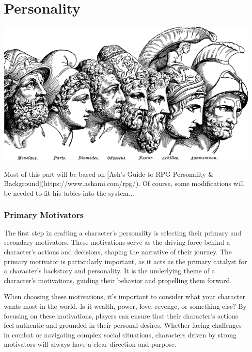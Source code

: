 \documentclass[12pt]{book}  %
\begin{document}

\chapter{Personality}

\begin{center}
    \includegraphics[width=\textwidth]{./images/personality01.pdf}
\end{center}

Most of this part will be based on [Ash’s Guide to RPG Personality \& Background](https://www.ashami.com/rpg/). Of course, some modifications will be needed to fit his tables into the system...

\subsection{\textbf{Primary Motivators}}

The first step in crafting a character's personality is selecting their primary and secondary motivators. These motivations serve as the driving force behind a character's actions and decisions, shaping the narrative of their journey. The primary motivator is particularly important, as it acts as the primary catalyst for a character's backstory and personality. It is the underlying theme of a character's motivations, guiding their behavior and propelling them forward.

When choosing these motivations, it's important to consider what your character wants most in the world. Is it wealth, power, love, revenge, or something else? By focusing on these motivations, players can ensure that their character's actions feel authentic and grounded in their personal desires. Whether facing challenges in combat or navigating complex social situations, characters driven by strong motivators will always have a clear direction and purpose.
\end{document}
